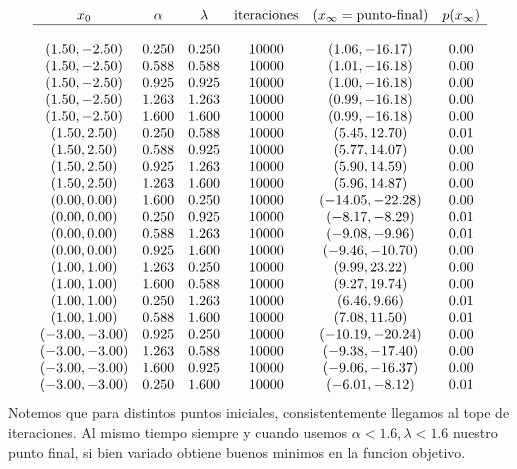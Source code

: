 \documentclass[letterpaper]{article}
\begin{document}
\[
\begin{array}{c c c c c c}
  x_0 & \alpha & \lambda & \text{iteraciones} &
        (x_{\infty} = \text{punto-final}) & p(x_{\infty}) \\
  \hline \\
  (1.50, -2.50)  & 0.250 & 0.250 & 10000 & (1.06, -16.17)   & 0.00 \\
  (1.50, -2.50)  & 0.588 & 0.588 & 10000 & (1.01, -16.18)   & 0.00 \\
  (1.50, -2.50)  & 0.925 & 0.925 & 10000 & (1.00, -16.18)   & 0.00 \\
  (1.50, -2.50)  & 1.263 & 1.263 & 10000 & (0.99, -16.18)   & 0.00 \\
  (1.50, -2.50)  & 1.600 & 1.600 & 10000 & (0.99, -16.18)   & 0.00 \\
  (1.50, 2.50)   & 0.250 & 0.588 & 10000 & (5.45, 12.70)    & 0.01 \\
  (1.50, 2.50)   & 0.588 & 0.925 & 10000 & (5.77, 14.07)    & 0.00 \\
  (1.50, 2.50)   & 0.925 & 1.263 & 10000 & (5.90, 14.59)    & 0.00 \\
  (1.50, 2.50)   & 1.263 & 1.600 & 10000 & (5.96, 14.87)    & 0.00 \\
  (0.00, 0.00)   & 1.600 & 0.250 & 10000 & (-14.05, -22.28) & 0.00 \\
  (0.00, 0.00)   & 0.250 & 0.925 & 10000 & (-8.17, -8.29)   & 0.01 \\
  (0.00, 0.00)   & 0.588 & 1.263 & 10000 & (-9.08, -9.96)   & 0.01 \\
  (0.00, 0.00)   & 0.925 & 1.600 & 10000 & (-9.46, -10.70)  & 0.00 \\
  (1.00, 1.00)   & 1.263 & 0.250 & 10000 & (9.99, 23.22)    & 0.00 \\
  (1.00, 1.00)   & 1.600 & 0.588 & 10000 & (9.27, 19.74)    & 0.00 \\
  (1.00, 1.00)   & 0.250 & 1.263 & 10000 & (6.46, 9.66)     & 0.01 \\
  (1.00, 1.00)   & 0.588 & 1.600 & 10000 & (7.08, 11.50)    & 0.01 \\
  (-3.00, -3.00) & 0.925 & 0.250 & 10000 & (-10.19, -20.24) & 0.00 \\
  (-3.00, -3.00) & 1.263 & 0.588 & 10000 & (-9.38, -17.40)  & 0.00 \\
  (-3.00, -3.00) & 1.600 & 0.925 & 10000 & (-9.06, -16.37)  & 0.00 \\
  (-3.00, -3.00) & 0.250 & 1.600 & 10000 & (-6.01, -8.12)   & 0.01 \\
\end{array}
\]
Notemos que para distintos puntos iniciales, consistentemente llegamos al
tope de iteraciones. Al mismo tiempo siempre y cuando usemos \(\alpha < 1.6,
\lambda < 1.6\) nuestro punto final, si bien variado obtiene buenos minimos en la funcion objetivo.
\end{document}
